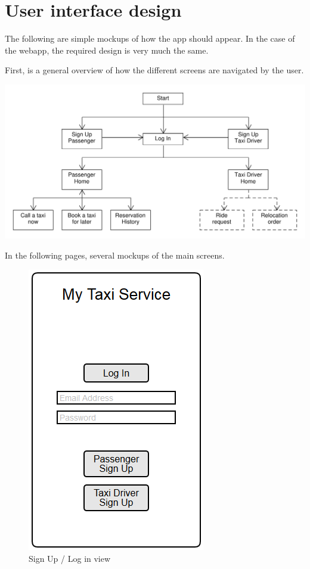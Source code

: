 \chapter{User interface design}
The following are simple mockups of how the \mts{} app should appear. In the case of the webapp, the required design is very much the same.

First, is a general overview of how the different screens are navigated by the user.

\begin{center}
\includegraphics[width=\textwidth]{tex-images/ui-general}
\end{center}

In the following pages, several mockups of the main screens.


\begin{figure}
\centering
\includegraphics{tex-images/ui-app}
\caption{Sign Up / Log in view}
\end{figure}



